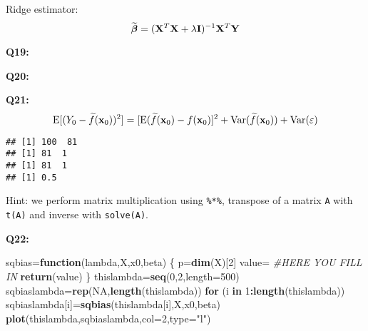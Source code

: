 \documentclass[]{article}
\newenvironment{Shaded}{\begin{snugshade}}{\end{snugshade}}
\newcommand{\KeywordTok}[1]{\textcolor[rgb]{0.13,0.29,0.53}{\textbf{#1}}}
\newcommand{\DataTypeTok}[1]{\textcolor[rgb]{0.13,0.29,0.53}{#1}}
\newcommand{\DecValTok}[1]{\textcolor[rgb]{0.00,0.00,0.81}{#1}}
\newcommand{\StringTok}[1]{\textcolor[rgb]{0.31,0.60,0.02}{#1}}
\newcommand{\CommentTok}[1]{\textcolor[rgb]{0.56,0.35,0.01}{\textit{#1}}}
\newcommand{\OtherTok}[1]{\textcolor[rgb]{0.56,0.35,0.01}{#1}}
\newcommand{\ControlFlowTok}[1]{\textcolor[rgb]{0.13,0.29,0.53}{\textbf{#1}}}
\newcommand{\OperatorTok}[1]{\textcolor[rgb]{0.81,0.36,0.00}{\textbf{#1}}}
\newcommand{\NormalTok}[1]{#1}
\begin{document}
Ridge estimator: \[
\widetilde{\boldsymbol \beta}=({\bf X}^T{\bf X}+\lambda {\bf I})^{-1}{\bf X}^T{\bf Y}
\]

\textbf{Q19:}

\textbf{Q20:}

\textbf{Q21:}
\[\text{E}[(Y_0-\widetilde{f}({\bf x}_0))^2]=[\text{E}(\widetilde{f}({\bf x}_0)-f({\bf x}_0)]^2+\text{Var}(\widetilde{f}({\bf x}_0) ) + \text{Var}(\varepsilon)\]

\begin{Shaded}
\end{Shaded}

\begin{verbatim}
## [1] 100  81
## [1] 81  1
## [1] 81  1
## [1] 0.5
\end{verbatim}

Hint: we perform matrix multiplication using \texttt{\%*\%}, transpose
of a matrix \texttt{A} with \texttt{t(A)} and inverse with
\texttt{solve(A)}.

\textbf{Q22:}

\begin{Shaded}
\begin{Highlighting}[]
\NormalTok{sqbias=}\ControlFlowTok{function}\NormalTok{(lambda,X,x0,beta)}
\NormalTok{\{}
\NormalTok{  p=}\KeywordTok{dim}\NormalTok{(X)[}\DecValTok{2}\NormalTok{]}
\NormalTok{  value=}\StringTok{ }\CommentTok{#HERE YOU FILL IN}
\StringTok{  }\KeywordTok{return}\NormalTok{(value)}
\NormalTok{\}}
\NormalTok{thislambda=}\KeywordTok{seq}\NormalTok{(}\DecValTok{0}\NormalTok{,}\DecValTok{2}\NormalTok{,}\DataTypeTok{length=}\DecValTok{500}\NormalTok{)}
\NormalTok{sqbiaslambda=}\KeywordTok{rep}\NormalTok{(}\OtherTok{NA}\NormalTok{,}\KeywordTok{length}\NormalTok{(thislambda))}
\ControlFlowTok{for}\NormalTok{ (i }\ControlFlowTok{in} \DecValTok{1}\OperatorTok{:}\KeywordTok{length}\NormalTok{(thislambda)) sqbiaslambda[i]=}\KeywordTok{sqbias}\NormalTok{(thislambda[i],X,x0,beta)}
\KeywordTok{plot}\NormalTok{(thislambda,sqbiaslambda,}\DataTypeTok{col=}\DecValTok{2}\NormalTok{,}\DataTypeTok{type=}\StringTok{"l"}\NormalTok{)}
\end{Highlighting}
\end{Shaded}
\end{document}
